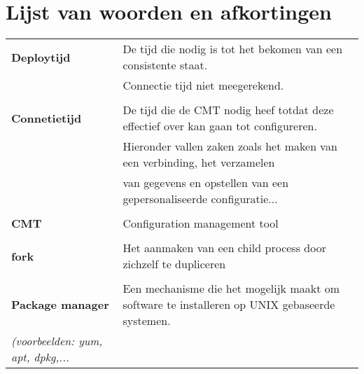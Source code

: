 


\chapter*{Lijst van woorden en afkortingen}
\printglossary[type=\acronymtype,title=Abbreviations]
\printglossary[title=Nomenclature]

\begin{tabular}{l  l }
\textbf{Deploytijd} & De tijd die nodig is tot het bekomen van een consistente staat. \\ &Connectie tijd niet meegerekend. \\ \\
\textbf{Connetietijd} & De tijd die de CMT nodig heef totdat deze effectief over kan gaan tot configureren. \\ &  Hieronder vallen zaken zoals het maken van een verbinding, het verzamelen  \\ & van gegevens en opstellen van een gepersonaliseerde configuratie... \\ \\
\textbf{CMT} & Configuration management tool \\ \\
\textbf{fork} & Het aanmaken van een child process door zichzelf te dupliceren \autocite{forkmeaning} \\ \\
\textbf{Package manager} & Een mechanisme die het mogelijk maakt om software te installeren op UNIX gebaseerde systemen.\\ \textit{(voorbeelden: yum, apt, dpkg,...} \\
\end{tabular}


